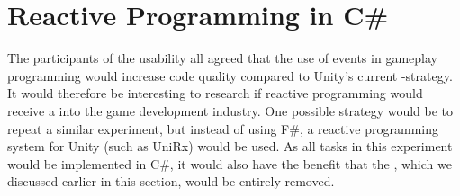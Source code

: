 \section{Reactive Programming in C\#}\label{sec:csharp-rp}
The participants of the usability all agreed that the use of events in gameplay programming would increase code quality compared to Unity's current -strategy. It would therefore be interesting to research if reactive programming would receive a  into the game development industry. One possible strategy would be to repeat a similar experiment, but instead of using F\#, a reactive programming system for Unity (such as UniRx\cite{unirx}) would be used. As all tasks in this experiment would be implemented in C\#, it would also have the benefit that the , which we discussed earlier in this section, would be entirely removed. 